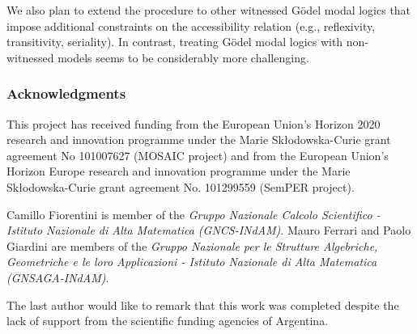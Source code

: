 \documentclass[copyright,creativecommons]{eptcs}
\begin{document}
We also plan to extend the procedure to other witnessed G\"odel modal
logics that impose additional constraints on the accessibility
relation (e.g., reflexivity, transitivity, seriality).  In contrast,
treating G\"odel modal logics with non-witnessed models seems to be
considerably more challenging.


\subsubsection*{Acknowledgments}

This project has received funding from the European Union's Horizon
2020 research and innovation programme under the Marie
Sk{\l}odowska-Curie grant agreement No 101007627 (MOSAIC project) and
from the European Union's Horizon Europe research and innovation
programme under the Marie Sk{\l}odowska-Curie grant agreement
No. 101299559 (SemPER project).

Camillo Fiorentini is member of the \emph{Gruppo Nazionale Calcolo
  Scientifico - Istituto Nazionale di Alta Matematica (GNCS-INdAM)}.
Mauro Ferrari and Paolo Giardini are members of the \emph{Gruppo
  Nazionale per le Strutture Algebriche, Geometriche e le loro
  Applicazioni - Istituto Nazionale di Alta Matematica
  (GNSAGA-INdAM)}.

The last author would like to remark that this work was completed
despite the lack of support from the scientific funding agencies of
Argentina.



%
%
\end{document}

